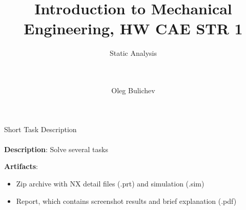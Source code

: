\documentclass[aspectratio=169]{beamer}
\title[IME]{Introduction to Mechanical Engineering, HW CAE STR 1} %
\subtitle{Static Analysis
\\ \  \\ \ 
         } %
\author{Oleg Bulichev}
\newcommand{\fbckg}[1]{\usebackgroundtemplate{\texttt{[image: \#1]}}}%
\begin{document}
\setlength{\abovedisplayskip}{0pt}
\setlength{\belowdisplayskip}{0pt}
\setlength{\abovedisplayshortskip}{0pt}
\setlength{\belowdisplayshortskip}{0pt}

\fbckg{fibeamer/figs/title_page.png}

\fbckg{fibeamer/figs/common.png}

\note{\scriptsize \begin{itemize}
        \item \
    \end{itemize}}


\begin{frame}[t]{Short Task Description}
    \framesubtitle{}
    \textbf{Description}: Solve several tasks

    \textbf{Artifacts}:
    \begin{itemize}
        \item Zip archive with NX detail files (.prt) and simulation (.sim)
        \item Report, which contains screenshot results and brief explanation (.pdf)
    \end{itemize}
\end{frame}
\end{document}
